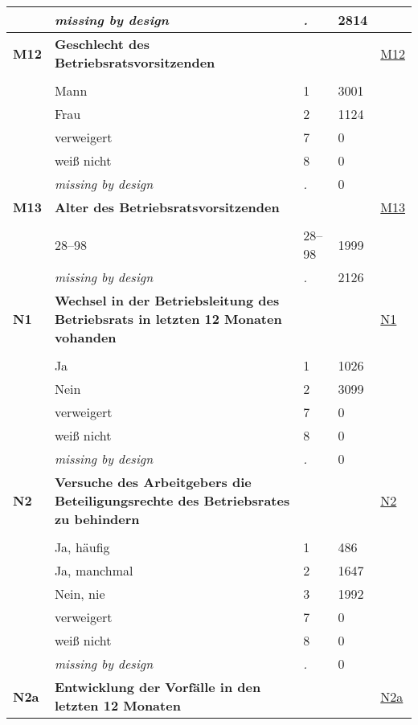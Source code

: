 \begin{longtable}{| L{2.65cm} | L{8cm} | C{1.5cm} | R{1.25cm} | C{2.25cm}  |}
   & \textit{missing by design} & \textit{.} & 2814 &  \\ 
   \midrule
\textbf{M12}\label{var:M12} & \textbf{Geschlecht des Betriebsratsvorsitzenden} &  &  & \hyperref[M12]{M12} \\ 
   &  &  &  &  \\ 
   & Mann & 1 & 3001 &  \\ 
   & Frau & 2 & 1124 &  \\ 
   & verweigert & 7 & 0 &  \\ 
   & weiß nicht & 8 & 0 &  \\ 
   & \textit{missing by design} & \textit{.} & 0 &  \\ 
   \midrule
\textbf{M13}\label{var:M13} & \textbf{Alter des Betriebsratsvorsitzenden} &  &  & \hyperref[M13]{M13} \\ 
   &  &  &  &  \\ 
   & 28--98 & 28--98 & 1999 &  \\ 
   & \textit{missing by design} & \textit{.} & 2126 &  \\ 
   \midrule
\textbf{N1}\label{var:N1} & \textbf{Wechsel in der Betriebsleitung des Betriebsrats in letzten 12 Monaten vohanden} &  &  & \hyperref[N1]{N1} \\ 
   &  &  &  &  \\ 
   & Ja & 1 & 1026 &  \\ 
   & Nein & 2 & 3099 &  \\ 
   & verweigert & 7 & 0 &  \\ 
   & weiß nicht & 8 & 0 &  \\ 
   & \textit{missing by design} & \textit{.} & 0 &  \\ 
   \midrule
\textbf{N2}\label{var:N2} & \textbf{Versuche des Arbeitgebers die Beteiligungsrechte des Betriebsrates zu behindern} &  &  & \hyperref[N2]{N2} \\ 
   &  &  &  &  \\ 
   & Ja, häufig & 1 & 486 &  \\ 
   & Ja, manchmal & 2 & 1647 &  \\ 
   & Nein, nie & 3 & 1992 &  \\ 
   & verweigert & 7 & 0 &  \\ 
   & weiß nicht & 8 & 0 &  \\ 
   & \textit{missing by design} & \textit{.} & 0 &  \\ 
   \midrule
\textbf{N2a}\label{var:N2a} & \textbf{Entwicklung der Vorfälle in den letzten 12 Monaten} &  &  & \hyperref[N2a]{N2a} \\ 

\end{longtable}
